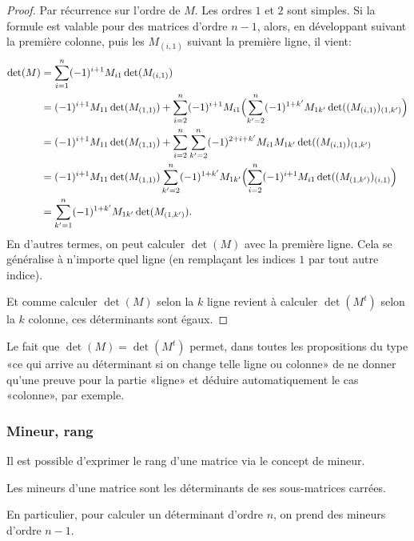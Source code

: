 \begin{proof}
    Par récurrence sur l'ordre de \( M \). Les ordres \( 1 \) et \( 2 \) sont simples. Si la formule est valable pour des matrices d'ordre \( n - 1 \), alors, en développant suivant la première colonne, puis les \( M_{(i,1)} \) suivant la première ligne, il vient:
      \begin{subequations}
  \begin{align}
    \det(M) &= \sum_{i = 1}^n (-1)^{i+1} M_{i1} \det(M_{(i,1)})\\
    &= (-1)^{i+1} M_{11} \det(M_{(1,1)}) + \sum_{i = 2}^n (-1)^{i+1} M_{i1} \Bigl(\sum_{k' = 2}^n (-1)^{1+k'} M_{1k'} \det((M_{(i,1)})_{(1,k')}\Bigr)\\
    &= (-1)^{i+1} M_{11} \det(M_{(1,1)}) + \sum_{i = 2}^n \sum_{k' = 2}^n (-1)^{2+i+k'} M_{i1}  M_{1k'} \det((M_{(i,1)})_{(1,k')}  \\
    &= (-1)^{i+1} M_{11} \det(M_{(1,1)}) \sum_{k' = 2}^n (-1)^{1+k'} M_{1k'} \Bigl(\sum_{i = 2}^n (-1)^{i+1} M_{i1} \det((M_{(1, k')})_{(i,1)}\Bigr)\\
    &= \sum_{k' = 1}^n (-1)^{1+k'} M_{1k'} \det(M_{(1,k')}).\\
  \end{align}  \end{subequations}
  En d'autres termes, on peut calculer \( \det (M) \) avec la première ligne. Cela se généralise à n'importe quel ligne (en remplaçant les indices \( 1 \) par tout autre indice).
  
  Et comme calculer \( \det(M) \) selon la \(k\)\ieme{} ligne revient à calculer \( \det(M^t) \) selon la \(k\)\ieme{} colonne, ces déterminants sont égaux.
\end{proof}

Le fait que \( \det(M)=\det(M^t)\) permet, dans toutes les propositions du type «ce qui arrive au déterminant si on change telle ligne ou colonne» de ne donner qu'une preuve pour la partie «ligne» et déduire automatiquement le cas «colonne», par exemple.

\subsubsection{Mineur, rang}

Il est possible d'exprimer le rang d'une matrice via le concept de mineur.
\begin{definition}
    Les mineurs d'une matrice sont les déterminants de ses sous-matrices carrées.
\end{definition}
En particulier, pour calculer un déterminant d'ordre \( n \), on prend des mineurs d'ordre \(n - 1\).

